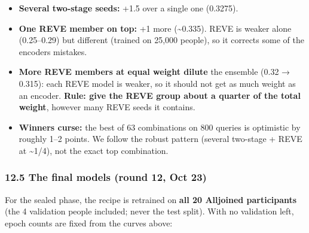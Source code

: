 \documentclass[
  11pt,
]{article}
\providecommand{\tightlist}{%
  \setlength{\itemsep}{0pt}\setlength{\parskip}{0pt}}
\renewcommand{\_}{\oldunderscore\allowbreak}
\begin{document}
\begin{itemize}
\tightlist
\item
  \textbf{Several two-stage seeds:} +1.5
  over a single one (0.3275).
\item
  \textbf{One REVE member on top:} +1
  more (\textasciitilde0.335). REVE is
  weaker alone (0.25--0.29) but
  different (trained on 25,000 people),
  so it corrects some of the
  encoders\textquotesingle{} mistakes.
\item
  \textbf{More REVE members at equal
  weight dilute} the ensemble (0.32 →
  0.315): each REVE model is weaker, so
  it should not get as much weight as an
  encoder. \textbf{Rule: give the REVE
  group about a quarter of the total
  weight}, however many REVE seeds it
  contains.
\item
  \textbf{Winner\textquotesingle s
  curse:} the best of 63 combinations on
  800 queries is optimistic by roughly
  1--2 points. We follow the robust
  pattern (several two-stage + REVE at
  \textasciitilde1/4), not the exact top
  combination.
\end{itemize}

\subsubsection{12.5 The final models
(round 12, Oct
23)}\label{the-final-models-round-12-oct-23}

For the sealed phase, the recipe is
retrained on \textbf{all 20 Alljoined
participants} (the 4 validation people
included; never the test split). With no
validation left, epoch counts are fixed
from the curves above:
\end{document}
